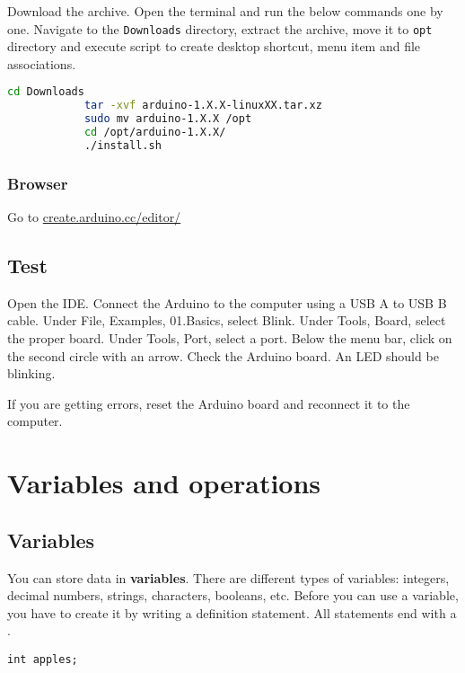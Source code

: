 \documentclass{article}
\begin{document}
			Download the  archive. Open the terminal and run the below commands one by one\@. Navigate to the \texttt{Downloads} directory, extract the archive, move it to \texttt{opt} directory and execute script to create desktop shortcut, menu item and file associations.

			\begin{lstlisting}[language=bash]
			cd Downloads
			tar -xvf arduino-1.X.X-linuxXX.tar.xz
			sudo mv arduino-1.X.X /opt
			cd /opt/arduino-1.X.X/
			./install.sh
			\end{lstlisting}

		\subsubsection{Browser}
			Go to \url{create.arduino.cc/editor/}

	\subsection{Test}

		Open the IDE\@. Connect the Arduino to the computer using a USB A to USB B cable. Under File, Examples, 01.Basics, select Blink. Under Tools, Board, select the proper board. Under Tools, Port, select a port. Below the menu bar, click on the second circle with an arrow. Check the Arduino board. An LED should be blinking.

		If you are getting errors, reset the Arduino board and reconnect it to the computer.

\section{Variables and operations}

	\subsection{Variables}

		You can store data in \textbf{variables}. There are different types of variables: integers, decimal numbers, strings, characters, booleans, etc. Before you can use a variable, you have to create it by writing a definition statement. All statements end with a \inlncd{;}.

		\begin{lstlisting}[caption={Definition}, label=definition]
		int apples;
		\end{lstlisting}
\end{document}
